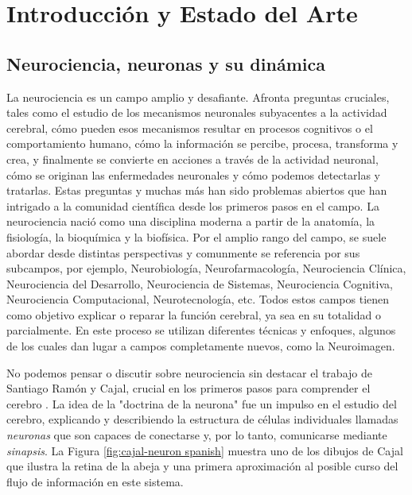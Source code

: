 \chapter{Introducción y Estado del Arte}
\label{c-intro spanish}

\section{Neurociencia, neuronas y su dinámica}
La neurociencia es un campo amplio y desafiante. Afronta preguntas cruciales, tales como el estudio de los mecanismos neuronales subyacentes a la actividad cerebral, cómo pueden esos mecanismos resultar en procesos cognitivos o el comportamiento humano, cómo la información se percibe, procesa, transforma y crea, y finalmente se convierte en acciones a través de la actividad neuronal, cómo se originan las enfermedades neuronales y cómo podemos detectarlas y tratarlas. 
Estas preguntas y muchas más han sido problemas abiertos que han intrigado a la comunidad científica desde los primeros pasos en el campo. La neurociencia nació como una disciplina moderna a partir de la anatomía, la fisiología, la bioquímica y la biofísica. Por el amplio rango del campo, se suele abordar desde distintas perspectivas y comunmente se referencia por sus subcampos, por ejemplo, Neurobiología, Neurofarmacología, Neurociencia Clínica, Neurociencia del Desarrollo, Neurociencia de Sistemas, Neurociencia Cognitiva, Neurociencia Computacional, Neurotecnología, etc. Todos estos campos tienen como objetivo explicar o reparar la función cerebral, ya sea en su totalidad o parcialmente. En este proceso se utilizan diferentes técnicas y enfoques, algunos de los cuales dan lugar a campos completamente nuevos, como la Neuroimagen.

No podemos pensar o discutir sobre neurociencia sin destacar el trabajo de Santiago Ramón y Cajal, crucial en los primeros pasos para comprender el cerebro \parencite{ramonycajal_textura_1899,decarlos_historical_2007,decastro_editorial_2016,delgado-garcia_cajal_2015,decastro_cajal_2019}. La idea de la "doctrina de la neurona" fue un impulso en el estudio del cerebro, explicando y describiendo la estructura de células individuales llamadas \textit{neuronas} que son capaces de conectarse y, por lo tanto, comunicarse mediante \textit{sinapsis}. La Figura \ref{fig:cajal-neuron spanish} muestra uno de los dibujos de Cajal que ilustra la retina de la abeja y una primera aproximación al posible curso del flujo de información en este sistema.

